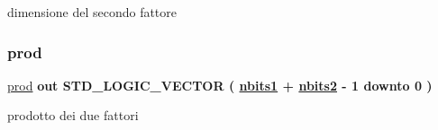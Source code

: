 dimensione del secondo fattore 

\mbox{\label{group___multiplier_gaf168dc69ad77dc5791b5e0f99dcfb0a9}} 
\subsubsection{\texorpdfstring{prod}{prod}}
{\footnotesize\ttfamily \hyperlink{group___multiplier_gaf168dc69ad77dc5791b5e0f99dcfb0a9}{prod} {\bfseries \textcolor{vhdlchar}{out}\textcolor{vhdlchar}{ }} {\bfseries \textcolor{vhdlchar}{S\+T\+D\+\_\+\+L\+O\+G\+I\+C\+\_\+\+V\+E\+C\+T\+OR}\textcolor{vhdlchar}{ }\textcolor{vhdlchar}{(}\textcolor{vhdlchar}{ }\textcolor{vhdlchar}{ }\textcolor{vhdlchar}{ }\textcolor{vhdlchar}{ }{\bfseries \hyperlink{group___multiplier_ga4ede473cdc13e75fe66fbd548b62e432}{nbits1}} \textcolor{vhdlchar}{+}\textcolor{vhdlchar}{ }\textcolor{vhdlchar}{ }\textcolor{vhdlchar}{ }{\bfseries \hyperlink{group___multiplier_ga8b5bdaff4c3669528aaec95a07e17c2a}{nbits2}} \textcolor{vhdlchar}{-\/}\textcolor{vhdlchar}{ } \textcolor{vhdldigit}{1} \textcolor{vhdlchar}{ }\textcolor{vhdlchar}{downto}\textcolor{vhdlchar}{ }\textcolor{vhdlchar}{ } \textcolor{vhdldigit}{0} \textcolor{vhdlchar}{ }\textcolor{vhdlchar}{)}\textcolor{vhdlchar}{ }} \hspace{0.3cm}{\ttfamily [Port]}}



prodotto dei due fattori 

